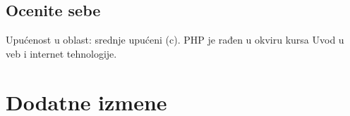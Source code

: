 \documentclass[a4paper]{report}
\begin{document}
\section{Ocenite sebe}

Upućenost u oblast: srednje upućeni (c). PHP je rađen u okviru kursa Uvod u veb i internet tehnologije.



\chapter{Dodatne izmene}
\end{document}

